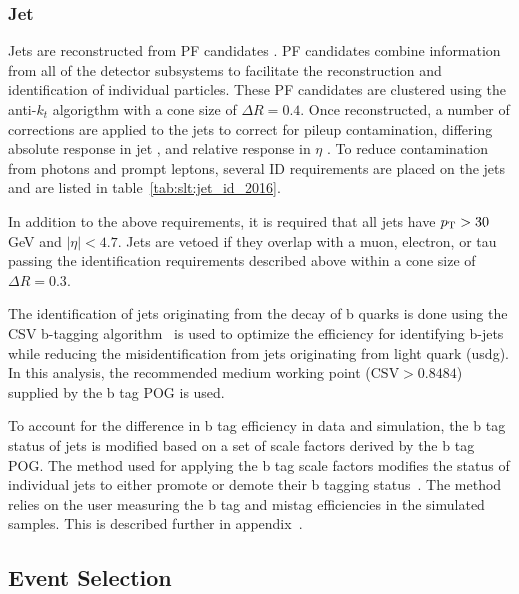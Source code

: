 \subsubsection{Jet}
Jets are reconstructed from PF candidates \cite{ref:pf}. PF candidates combine information from all of the detector subsystems to facilitate the reconstruction and identification of individual particles.  These PF candidates are clustered using the anti-$k_{t}$ algorigthm \cite{Cacciari:2008gp} with a cone size of $\Delta R = 0.4$. Once reconstructed, a number of corrections are applied to the jets to correct for pileup contamination, differing absolute response in jet \pt, and relative response in $\eta$ \cite{ref:jetscale}.  To reduce contamination from photons and prompt leptons, several ID requirements are placed on the jets and are listed in table~\ref{tab:slt:jet_id_2016}.



\noindent In addition to the above requirements, it is required that all jets have $p_{\mathrm{T}} > 30$ GeV and $\left|\eta\right| < 4.7$.  Jets are vetoed if they overlap with a muon, electron, or tau passing the identification requirements described above within a cone size of $\Delta R = 0.3$. 

The identification of jets originating from the decay of b quarks is done using the CSV b-tagging algorithm~\cite{Sirunyan:2298594} is used to optimize the efficiency for identifying b-jets while reducing the misidentification from jets originating from light quark (usdg).  In this analysis, the recommended medium working point ($\text{CSV} > 0.8484$) supplied by the b tag POG is used.  

To account for the difference in b tag efficiency in data and simulation, the b tag status of jets is modified based on a set of scale factors derived by the b tag POG.  The method used for applying the b tag scale factors modifies the status of individual jets to either promote or demote their b tagging status~\cite{twiki:btag_method}.  The method relies on the user measuring the b tag and mistag efficiencies in the simulated samples.  This is described further in appendix~\label{app:btag}.


\FloatBarrier

\subsection{Event Selection}

